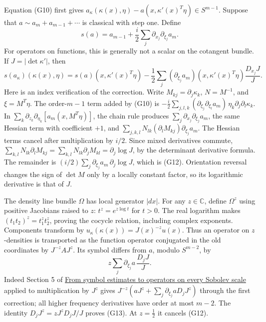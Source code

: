 \documentclass[
  11pt,
]{article}
\begin{document}
Equation (G10) first gives
\(a_\kappa(\kappa(x),\eta)-a(x,\kappa'(x)^T\eta)\in S^{m-1}\). Suppose
that \(a\sim a_m+a_{m-1}+\cdots\) is classical with step one. Define \[
s(a)=a_{m-1}+\frac{i}{2}\sum_j\partial_{x_j}\partial_{\xi_j}a_m.
\tag{G11}
\] For operators on functions, this is generally not a scalar on the
cotangent bundle. If \(J=|\det\kappa'|\), then \[
s(a_\kappa)(\kappa(x),\eta)
=s(a)(x,\kappa'(x)^T\eta)
-\frac12\sum_j(\partial_{\xi_j}a_m)(x,\kappa'(x)^T\eta)
\frac{D_{x_j}J}{J}.
\tag{G12}
\] Here is an index verification of the correction. Write
\(M_{kj}=\partial_j\kappa_k\), \(N=M^{-1}\), and \(\xi=M^T\eta\). The
order-\(m-1\) term added by (G10) is
\(-\frac i2\sum_{j,l,k}(\partial_{\xi_j}\partial_{\xi_l}a_m)\,\eta_k\partial_j\partial_l\kappa_k\).
In \(\sum_k\partial_{z_k}\partial_{\eta_k}[a_m(x,M^T\eta)]\), the chain
rule produces \(\sum_j\partial_{x_j}\partial_{\xi_j}a_m\), the same
Hessian term with coefficient \(+1\), and
\(\sum_{j,k,l}N_{lk}(\partial_lM_{kj})\partial_{\xi_j}a_m\). The Hessian
terms cancel after multiplication by \(i/2\). Since mixed derivatives
commute,
\(\sum_{k,l}N_{lk}\partial_lM_{kj}=\sum_{k,l}N_{lk}\partial_jM_{kl}=\partial_j\log J\),
by the determinant derivative formula. The remainder is
\((i/2)\sum_j\partial_{\xi_j}a_m\,\partial_j\log J\), which is (G12).
Orientation reversal changes the sign of \(\det M\) only by a locally
constant factor, so its logarithmic derivative is that of \(J\).

The density line bundle \(\Omega\) has local generator \(|dx|\). For any
\(z\in\mathbb C\), define \(\Omega^z\) using positive Jacobians raised
to \(z\): \(t^z=e^{z\log t}\) for \(t>0\). The real logarithm makes
\((t_1t_2)^z=t_1^zt_2^z\), proving the cocycle relation, including
complex exponents. Components transform by
\(u_\kappa(\kappa(x))=J(x)^{-z}u(x)\). Thus an operator on
\(z\)-densities is transported as the function operator conjugated in
the old coordinates by \(J^{-z}AJ^z\). Its symbol differs from \(a\),
modulo \(S^{m-2}\), by \[
z\sum_j\partial_{\xi_j}a\,\frac{D_jJ}{J}.
\tag{G13}
\] Indeed Section 5 of \href{euclidean-symbol-calculus.pdf}{From symbol
estimates to operators on every Sobolev scale} applied to multiplication
by \(J^z\) gives \(J^{-z}(aJ^z+\sum_j\partial_{\xi_j}a D_jJ^z)\) through
the first correction; all higher frequency derivatives have order at
most \(m-2\). The identity \(D_jJ^z=zJ^zD_jJ/J\) proves (G13). At
\(z=\frac12\) it cancels (G12).
\end{document}
